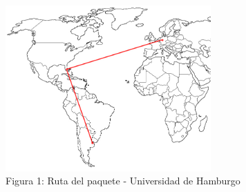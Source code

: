 \begin{figure}[h]
	\begin{center}
    \includegraphics[width=0.7\textwidth]{img_analisis3/mapa.jpg} 
    \caption{Figura 1: Ruta del paquete - Universidad de Hamburgo}	
	\end{center} 
\end{figure}
\vspace{0.25cm}